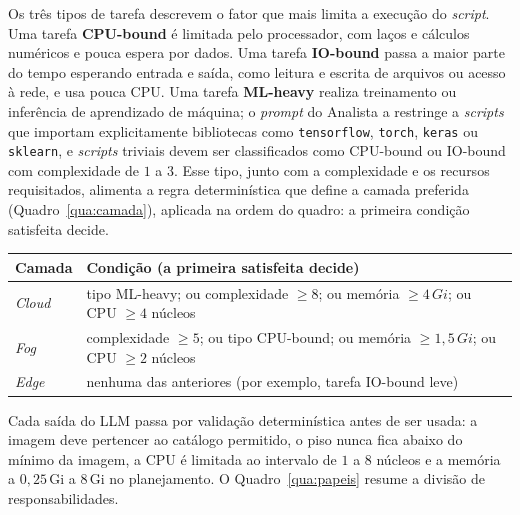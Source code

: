 \documentclass[11pt,a4paper]{article}
\newcommand{\fonte}[1]{\par\vspace{2pt}{\footnotesize Fonte: #1\par}}
\newcommand{\gi}[1]{\ensuremath{#1}\,Gi}
\begin{document}
Os três tipos de tarefa descrevem o fator que mais limita a execução do
\textit{script}. Uma tarefa \textbf{CPU-bound} é limitada pelo processador,
com laços e cálculos numéricos e pouca espera por dados. Uma tarefa
\textbf{IO-bound} passa a maior parte do tempo esperando entrada e saída, como
leitura e escrita de arquivos ou acesso à rede, e usa pouca CPU. Uma tarefa
\textbf{ML-heavy} realiza treinamento ou inferência de aprendizado de
máquina; o \textit{prompt} do Analista a restringe a \textit{scripts} que
importam explicitamente bibliotecas como \texttt{tensorflow},
\texttt{torch}, \texttt{keras} ou \texttt{sklearn}, e \textit{scripts}
triviais devem ser classificados como CPU-bound ou IO-bound com complexidade
de $1$ a $3$. Esse tipo, junto com a complexidade e os recursos
requisitados, alimenta a regra determinística que define a camada preferida
(Quadro~\ref{qua:camada}), aplicada na ordem do quadro: a primeira condição
satisfeita decide.

\begin{quadro}[h]
  \caption{Regra de camada preferida a partir do perfil da tarefa.}
  \label{qua:camada}
  \centering\footnotesize
  \setlength{\tabcolsep}{3pt}
  \begin{tabularx}{\linewidth}{|>{\raggedright\arraybackslash}p{1.5cm}|>{\raggedright\arraybackslash}X|}
    \hline
    \textbf{Camada} & \textbf{Condição (a primeira satisfeita decide)}\\ \hline
    \textit{Cloud} & tipo ML-heavy; ou complexidade $\geq 8$; ou memória
      $\geq\gi{4}$; ou CPU $\geq 4$ núcleos\\ \hline
    \textit{Fog} & complexidade $\geq 5$; ou tipo CPU-bound; ou memória
      $\geq\gi{1{,}5}$; ou CPU $\geq 2$ núcleos\\ \hline
    \textit{Edge} & nenhuma das anteriores (por exemplo, tarefa IO-bound
      leve)\\ \hline
  \end{tabularx}
  \fonte{Elaborado pelo autor (2026).}
\end{quadro}

Cada saída do LLM passa por validação determinística antes de ser usada: a
imagem deve pertencer ao catálogo permitido, o piso nunca fica abaixo do
mínimo da imagem, a CPU é limitada ao intervalo de $1$ a $8$ núcleos e a
memória a \gi{0,25} a \gi{8} no planejamento. O Quadro~\ref{qua:papeis}
resume a divisão de responsabilidades.
\end{document}
